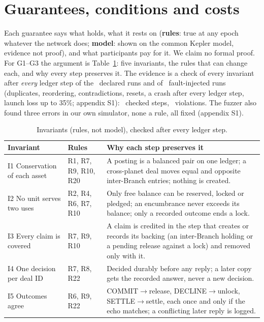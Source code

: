 \section{Guarantees, conditions and costs}\label{sec:guar}

Each guarantee says what holds, what it rests on (\textbf{rules}: true at any epoch whatever the network does;
\textbf{model}: shown on the common Kepler model, evidence not proof), and what participants pay for it. We claim no formal proof. For G1--G3 the argument is
Table~\ref{tab:inv}: five invariants, the rules that can change each, and why every step preserves it. The evidence is a check of every invariant after
\emph{every} ledger step of the \SimRuns\ declared runs and of \FuzzRuns\ fault-injected runs (duplicates, reordering, contradictions, resets, a crash after every
ledger step, launch loss up to 35\%; appendix S1): \FuzzSteps\ checked steps, \FuzzFailures\ violations. The fuzzer also found three errors in our own simulator, none a
rule, all fixed (appendix S1).

\begin{table}[H]\centering
\begin{tabularx}{\linewidth}{>{\raggedright\arraybackslash}p{2.7cm}>{\raggedright\arraybackslash}p{1.9cm}X}
\toprule
Invariant & Rules & Why each step preserves it\\
\midrule
I1 Conservation of each asset & R1, R7, R9, R10, R20 & A posting is a balanced pair on one ledger; a cross-planet deal moves equal and opposite
inter-Branch entries; nothing is created.\\
I2 No unit serves two uses & R2, R4, R6, R7, R10 & Only free balance can be reserved, locked or pledged; an encumbrance never exceeds its balance;
only a recorded outcome ends a lock.\\
I3 Every claim is covered & R7, R9, R10 & A claim is credited in the step that creates or records its backing (an inter-Branch holding or a pending release against a
lock) and removed only with it.\\
I4 One decision per deal ID & R7, R8, R22 & Decided durably before any reply; a later copy gets the recorded answer, never a new decision.\\
I5 Outcomes agree & R6, R9, R22 & COMMIT$\to$release, DECLINE$\to$unlock, SETTLE$\to$settle, each once and only if the echo matches; a conflicting later reply is logged.\\
\bottomrule
\end{tabularx}
\caption{Invariants (rules, not model), checked after every ledger step.}\label{tab:inv}
\end{table}

